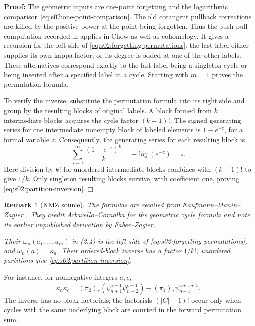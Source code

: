 \documentclass[a4paper,10pt]{article}
\numberwithin{equation}{section}
\theoremstyle{paperplain}
\theoremstyle{paperremark}
\newtheorem{rmk}{Remark}[section]
\theoremstyle{paperplain}
\newenvironment{prf}{\noindent \textbf{Proof: }}{\hfill $\mdlgwhtsquare$\par\addvspace{0.5\baselineskip}}
\begin{document}
\begin{prf}
The geometric inputs are one-point forgetting and the logarithmic
comparison \eqref{eq:s02:one-point-comparison}.  The old cotangent
pullback corrections are killed by the positive power at the point
being forgotten.  Thus the push-pull computation recorded in
\cite[(2.9)--(2.11)]{KMZ96v1} applies in Chow as well as cohomology.
It gives a recursion for the left side of
\eqref{eq:s02:forgetting-permutations}: the last label either supplies
its own kappa factor, or its degree is added at one of the other
labels.  These alternatives correspond exactly to the last label
being a singleton cycle or being inserted after a specified label in
a cycle.  Starting with $m=1$ proves the permutation formula.

To verify the inverse, substitute the permutation formula into its
right side and group by the resulting blocks of original labels.  A
block formed from $k$ intermediate blocks acquires the cycle factor
$(k-1)!$.  The signed generating series for one intermediate nonempty
block of labeled elements is $1-e^{-z}$, for a formal variable $z$.
Consequently, the generating series for each resulting block is
\[
\sum_{k=1}^{\infty}\frac{(1-e^{-z})^k}{k}
=-\log(e^{-z})=z.
\]
Here division by $k!$ for unordered intermediate blocks combines with
$(k-1)!$ to give $1/k$.  Only singleton resulting blocks survive,
with coefficient one, proving \eqref{eq:s02:partition-inversion}.
\end{prf}

\begin{rmk}[KMZ source]
\label{rmk:s02:forgetting-source}
The formulas are recalled from Kaufmann--Manin--Zagier
\cite[Theorem 2.2, (2.6), and Lemma 2.2.1, (2.8)]{KMZ96v1}.
They credit Arbarello--Cornalba for the geometric cycle formula and
note its earlier unpublished derivation by Faber--Zagier.

Their $\omega_n(a_1,\ldots,a_m)$ in (2.4) is the left side of
\eqref{eq:s02:forgetting-permutations}, and $\omega_n(a)=\kappa_a$.
Their ordered-block inverse has a factor $1/k!$; unordered partitions
give \eqref{eq:s02:partition-inversion}.
\end{rmk}

For instance, for nonnegative integers $a,c$,
\begin{equation}
\label{eq:s02:two-kappas}
\kappa_a\kappa_c
=(\pi_2)_*(\psi_{n+1}^{a+1}\psi_{n+2}^{c+1})
-(\pi_1)_*\psi_{n+1}^{a+c+1}.
\end{equation}
The inverse has no block factorials; the factorials $(|C|-1)!$ occur
only when cycles with the same underlying block are counted in the
forward permutation sum.
\end{document}
